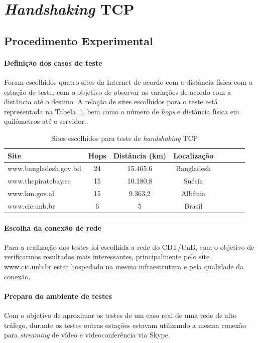 \documentclass[12pt,a4paper]{report}
\begin{document}
\section{\textit{Handshaking} TCP}

\subsection{Procedimento Experimental}

\paragraph{Definição dos casos de teste} Foram escolhidos quatro sites da Internet de acordo com a distância física com a estação de teste, com o objetivo de observar as variações de acordo com a distância até o destino. A relação de sites escolhidos para o teste está representada na Tabela~\ref{tab:siteshandshaking}, bem como o número de \textit{hops} e distância física em quilômetros até o servidor.

\begin{table}[h]
	\center
	\begin{tabular}{l*{6}{c}r}
	Site						& Hops	& Distância (km)	& Localização\\
	\hline
	www.bangladesh.gov.bd		& 24		& 15.465,6		& Bangladesh\\
	www.thepiratebay.se		& 15		& 10.180,8		& Suécia\\
	www.km.gov.al				& 15		& 9.363,2			& Albânia\\
	www.cic.unb.br				& 6		& 5				& Brasil\\
	\end{tabular}
	\caption{Sites escolhidos para teste de \textit{handshaking} TCP}
	\label{tab:siteshandshaking}
\end{table}

\paragraph{Escolha da conexão de rede} Para a realização dos testes foi escolhida a rede do CDT/UnB, com o objetivo de verificarmos resultados mais interessantes, principalmente pelo site www.cic.unb.br estar hospedado na mesma infraestrutura e pela qualidade da conexão.

\paragraph{Preparo do ambiente de testes} Com o objetivo de aproximar os testes de um caso real de uma rede de alto tráfego, durante os testes outras estações estavam utilizando a mesma conexão para \textit{streaming} de vídeo e videoconferência via Skype.
\end{document}
